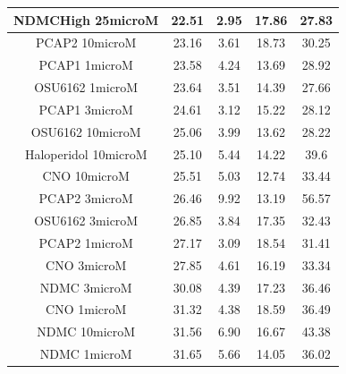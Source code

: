 \begin{table}[h!]
\begin{tabular}{|c|c|c|c|c|}
NDMCHigh 25microM     & 22.51 & 2.95 & 17.86 & 27.83 \\ \hline
PCAP2 10microM        & 23.16 & 3.61 & 18.73 & 30.25 \\ \hline
PCAP1 1microM         & 23.58 & 4.24 & 13.69 & 28.92 \\ \hline
OSU6162 1microM       & 23.64 & 3.51 & 14.39 & 27.66 \\ \hline
PCAP1 3microM         & 24.61 & 3.12 & 15.22 & 28.12 \\ \hline
OSU6162 10microM      & 25.06 & 3.99 & 13.62 & 28.22 \\ \hline
Haloperidol 10microM  & 25.10  & 5.44 & 14.22 & 39.6  \\ \hline
CNO 10microM          & 25.51 & 5.03 & 12.74 & 33.44 \\ \hline
PCAP2 3microM         & 26.46 & 9.92 & 13.19 & 56.57 \\ \hline
OSU6162 3microM       & 26.85 & 3.84 & 17.35 & 32.43 \\ \hline
PCAP2 1microM         & 27.17 & 3.09 & 18.54 & 31.41 \\ \hline
CNO 3microM           & 27.85 & 4.61 & 16.19 & 33.34 \\ \hline
NDMC 3microM          & 30.08 & 4.39 & 17.23 & 36.46 \\ \hline
CNO 1microM           & 31.32 & 4.38 & 18.59 & 36.49 \\ \hline
NDMC 10microM         & 31.56 & 6.90  & 16.67 & 43.38 \\ \hline
NDMC 1microM          & 31.65 & 5.66 & 14.05 & 36.02 \\ \hline
\end{tabular}
\end{table}
